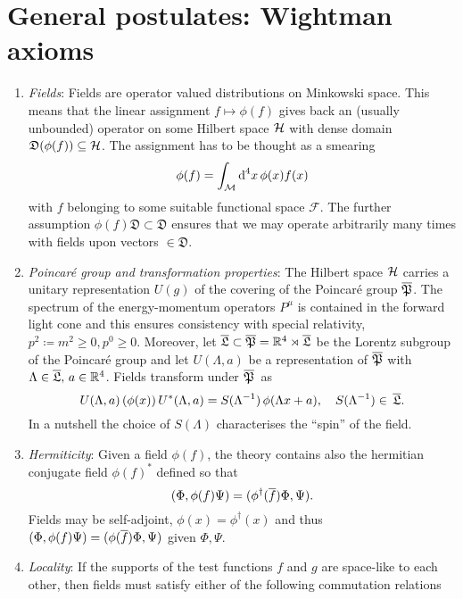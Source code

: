 \section{General postulates: Wightman axioms}
\label{Wightman}
 \begin{enumerate}[label=\Alph*.]
  \item \emph{Fields}:        
        Fields are operator valued distributions on Minkowski space.
        This means that the linear assignment $f\mapsto\phi(f)$ gives
        back an (usually unbounded) operator on some Hilbert space 
        $\mathcal{H}$ with dense domain $\mathfrak{D}(\phi(f))\subseteq\mathcal{H}$. 
        The assignment has to be thought as a smearing
        \[
        \phi(f)=\int_{\mathcal{M}} \textrm{d}^4x\,\phi(x)f(x)
        \]
        with $f$ belonging to some suitable functional space $\mathcal{F}$.
        The further assumption $\phi(f)\mathfrak{D}\subset\mathfrak{D}$
        ensures that we may operate arbitrarily many times with fields
        upon vectors $\in\mathfrak{D}$.
  \item \emph{Poincar\'{e} group and transformation properties}: 
        The Hilbert space $\mathcal{H}$ carries
        a unitary representation $U(g)$ of the covering of the 
        Poincar\'{e} group $\overline{\mathfrak{P}}$. The spectrum of the energy-momentum
        operators $P^{\mu}$ is contained in the forward light cone
        and this ensures consistency with special relativity,
        $p^2\coloneqq m^2\geq 0, p^0\geq 0$. Moreover, let $\overline{\mathfrak{L}}\subset\overline{\mathfrak{P}} = 
        \mathbb{R}^4 \rtimes \overline{\mathfrak{L}}$ be the Lorentz subgroup of the Poincar\'{e}
        group and let $U(\Lambda,a)$ be a representation of $\overline{\mathfrak{P}}$
        with $\Lambda\in\overline{\mathfrak{L}},\,a\in\mathbb{R}^4$. Fields transform under $\overline{\mathfrak{P}}$~as
        \[
        U(\Lambda,a)\,(\phi(x))\,U^*(\Lambda,a)= S(\Lambda^{-1})\,
        \phi(\Lambda x+a),\quad S(\Lambda^{-1})\in\,\overline{\mathfrak{L}}.
        \]
        In a nutshell the choice of $S(\Lambda)$ characterises the
        ``spin'' of the field.
  \item \emph{Hermiticity}: Given a field $\phi(f)$, the theory
	contains also the hermitian conjugate field $\phi(f)^*$ 
	defined so that 
	\[
	(\Phi,\phi(f)\Psi)=(\phi^{\dagger}(\overline{f})\Phi,\Psi).
	\]
	Fields may be self-adjoint, $\phi(x)=\phi^{\dagger}(x)$ and
	thus $(\Phi,\phi(f)\Psi)=(\phi(\overline{f})\Phi,\Psi)$
	given $\Phi,\Psi$.
  \item \emph{Locality}: If the supports of the test functions $f$ and
	$g$ are space-like to each other, then fields must satisfy either
	of the following commutation relations

\end{enumerate}
